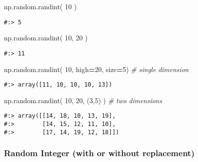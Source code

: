 \documentclass[
]{book}
\newenvironment{Shaded}{\begin{snugshade}}{\end{snugshade}}
\newcommand{\CommentTok}[1]{\textcolor[rgb]{0.37,0.37,0.37}{\textit{#1}}}
\newcommand{\DecValTok}[1]{\textcolor[rgb]{0.06,0.06,0.06}{#1}}
\newcommand{\NormalTok}[1]{#1}
\newcommand{\OperatorTok}[1]{\textcolor[rgb]{0.43,0.43,0.43}{\textbf{#1}}}
\begin{document}
\begin{Shaded}
\begin{Highlighting}[]
\NormalTok{np.random.randint( }\DecValTok{10}\NormalTok{ )}
\end{Highlighting}
\end{Shaded}

\begin{verbatim}
#:> 5
\end{verbatim}

\begin{Shaded}
\begin{Highlighting}[]
\NormalTok{np.random.randint( }\DecValTok{10}\NormalTok{, }\DecValTok{20}\NormalTok{ )}
\end{Highlighting}
\end{Shaded}

\begin{verbatim}
#:> 11
\end{verbatim}

\begin{Shaded}
\begin{Highlighting}[]
\NormalTok{np.random.randint( }\DecValTok{10}\NormalTok{, high}\OperatorTok{=}\DecValTok{20}\NormalTok{, size}\OperatorTok{=}\DecValTok{5}\NormalTok{)   }\CommentTok{\# single dimension}
\end{Highlighting}
\end{Shaded}

\begin{verbatim}
#:> array([11, 10, 10, 10, 13])
\end{verbatim}

\begin{Shaded}
\begin{Highlighting}[]
\NormalTok{np.random.randint( }\DecValTok{10}\NormalTok{, }\DecValTok{20}\NormalTok{, (}\DecValTok{3}\NormalTok{,}\DecValTok{5}\NormalTok{) )        }\CommentTok{\# two dimensions}
\end{Highlighting}
\end{Shaded}

\begin{verbatim}
#:> array([[14, 18, 10, 13, 19],
#:>        [14, 15, 12, 11, 10],
#:>        [17, 14, 19, 12, 18]])
\end{verbatim}

\hypertarget{random-integer-with-or-without-replacement}{%
\subsubsection{Random Integer (with or without replacement)}\label{random-integer-with-or-without-replacement}}
\end{document}
